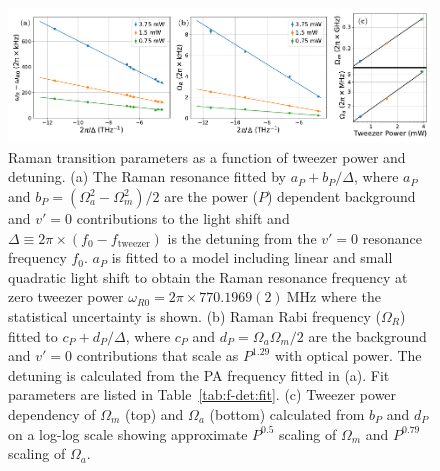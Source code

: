\documentclass[aps,prl,twocolumn,10pt,superscriptaddress]{revtex4-1}
\newcommand{\paren}[1]{{\left({#1}\right)}}
\newcommand{\todo}[1]{}
\begin{document}
\begin{figure}[t!]
  \includegraphics[width=\textwidth]{imgs/fig-det.pdf}
  \caption{Raman transition parameters as a function of tweezer power and detuning.
    (a) The Raman resonance fitted by $a_P+b_P/\Delta$, where
    $a_P$ and $b_P=(\Omega_a^2-\Omega_m^2)/2$
    are the power ($P$) dependent background and $v'=0$ contributions
    to the light shift and
    $\Delta\equiv2\pi\times\paren{f_0 - f_{\mathrm{tweezer}}}$ is the detuning from
    the $v'=0$ resonance frequency $f_0$.
    $a_P$ is fitted to a model including linear and small quadratic light shift
    \todo{which assumes $\Omega_m\gg\Omega_a$} to obtain the Raman resonance frequency
    at zero tweezer power $\omega_{R0}=2\pi\times770.1969(2)~\mathrm{MHz}$ where the statistical uncertainty is shown.
    (b) Raman Rabi frequency ($\Omega_R$) fitted to $c_P+d_P/\Delta$, where
    $c_P$ and $d_P=\Omega_a\Omega_m/2$
    are the background and $v'=0$ contributions that scale as $P^{1.29}$ with optical power.
    The detuning is calculated from the PA frequency fitted in (a). Fit parameters are listed in Table~\ref{tab:f-det:fit}.
    (c) Tweezer power dependency of $\Omega_m$ (top) and $\Omega_a$ (bottom) calculated from
    $b_P$ and $d_P$ on a log-log scale showing approximate $P^{0.5}$ scaling of $\Omega_m$ and
    $P^{0.79}$ scaling of $\Omega_a$.
    \label{f-det}}
\end{figure}
\end{document}
